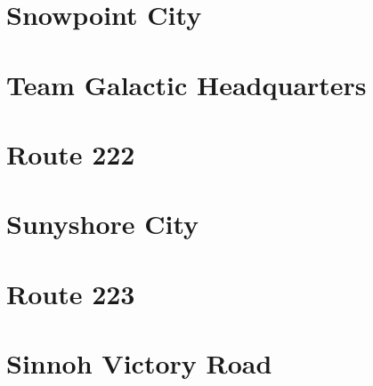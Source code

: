 \documentclass[11pt]{article}
\begin{document}


\section{Snowpoint City}\label{sec:snowpoint-city}

\section{Team Galactic Headquarters}\label{sec:team-galactic-headquarters}

\section{Route 222}\label{sec:route-222}




\section{Sunyshore City}\label{sec:sunyshore-city}

\section{Route 223}\label{sec:route-223}



\section{Sinnoh Victory Road}\label{sec:sinnoh-victory-road}



% 
% 


\end{document}
